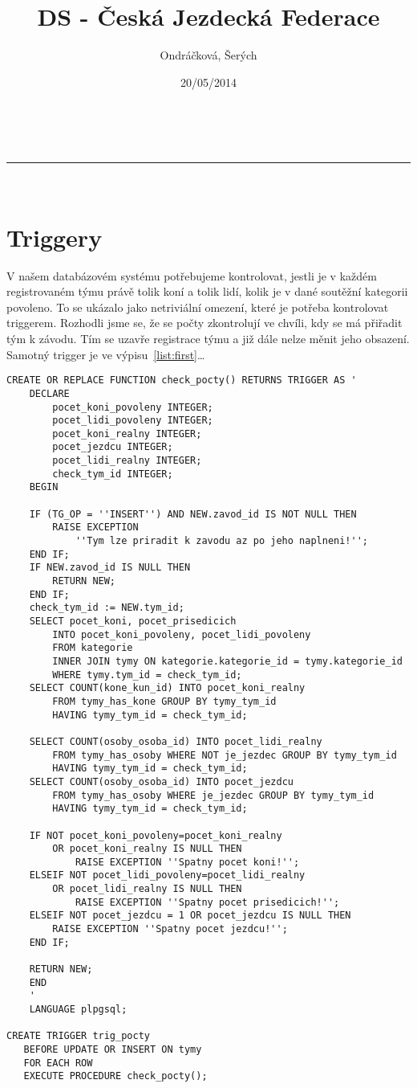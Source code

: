\documentclass[a4paper,11pt]{article}
\makeatletter
\newcommand{\linia}{\rule{\linewidth}{0.5pt}}
\theoremstyle{mytheor}
\renewcommand{\maketitle}{
\begin{center}
\vspace{2ex}
{\huge \textsc{\@title}}
\vspace{1ex}
\\
\linia\\
\@author \hfill \@date
\vspace{4ex}
\end{center}
}
\makeatother
\begin{document}
\title{DS - Česká Jezdecká Federace}

\author{Ondráčková, Šerých}

\date{20/05/2014}

\maketitle

\section*{Triggery}

V našem databázovém systému potřebujeme kontrolovat, jestli je v každém registrovaném týmu právě tolik koní a tolik lidí, kolik je v dané soutěžní kategorii povoleno. To se ukázalo jako netriviální omezení, které je potřeba kontrolovat triggerem. Rozhodli jsme se, že se počty zkontrolují ve chvíli, kdy se má přiřadit tým k závodu. Tím se uzavře registrace týmu a již dále nelze měnit jeho obsazení. Samotný trigger je ve výpisu~\ref{list:first}\ldots{}

\begin{lstlisting}[label={list:first},caption=trigger check pocty.]
CREATE OR REPLACE FUNCTION check_pocty() RETURNS TRIGGER AS '
	DECLARE
		pocet_koni_povoleny INTEGER;
		pocet_lidi_povoleny INTEGER;
		pocet_koni_realny INTEGER;
		pocet_jezdcu INTEGER;
		pocet_lidi_realny INTEGER;
		check_tym_id INTEGER;
	BEGIN
	
	IF (TG_OP = ''INSERT'') AND NEW.zavod_id IS NOT NULL THEN
		RAISE EXCEPTION 
			''Tym lze priradit k zavodu az po jeho naplneni!'';
	END IF;
	IF NEW.zavod_id IS NULL THEN
		RETURN NEW;
	END IF;
	check_tym_id := NEW.tym_id;
	SELECT pocet_koni, pocet_prisedicich
		INTO pocet_koni_povoleny, pocet_lidi_povoleny
		FROM kategorie
		INNER JOIN tymy ON kategorie.kategorie_id = tymy.kategorie_id
		WHERE tymy.tym_id = check_tym_id;
	SELECT COUNT(kone_kun_id) INTO pocet_koni_realny
		FROM tymy_has_kone GROUP BY tymy_tym_id
		HAVING tymy_tym_id = check_tym_id;

	SELECT COUNT(osoby_osoba_id) INTO pocet_lidi_realny
		FROM tymy_has_osoby WHERE NOT je_jezdec GROUP BY tymy_tym_id
		HAVING tymy_tym_id = check_tym_id;
	SELECT COUNT(osoby_osoba_id) INTO pocet_jezdcu
		FROM tymy_has_osoby WHERE je_jezdec GROUP BY tymy_tym_id 
		HAVING tymy_tym_id = check_tym_id; 

	IF NOT pocet_koni_povoleny=pocet_koni_realny
		OR pocet_koni_realny IS NULL THEN
			RAISE EXCEPTION ''Spatny pocet koni!'';
	ELSEIF NOT pocet_lidi_povoleny=pocet_lidi_realny
		OR pocet_lidi_realny IS NULL THEN
			RAISE EXCEPTION ''Spatny pocet prisedicich!'';
	ELSEIF NOT pocet_jezdcu = 1 OR pocet_jezdcu IS NULL THEN
		RAISE EXCEPTION ''Spatny pocet jezdcu!'';
	END IF;

	RETURN NEW;
	END
	'
	LANGUAGE plpgsql;

CREATE TRIGGER trig_pocty
   BEFORE UPDATE OR INSERT ON tymy
   FOR EACH ROW
   EXECUTE PROCEDURE check_pocty();
\end{lstlisting}
\end{document}
